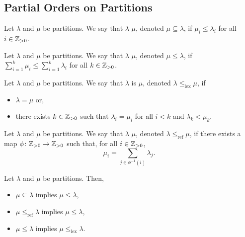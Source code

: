 \subsection{Partial Orders on Partitions}

\begin{definition}
    Let \(\lambda\) and \(\mu\) be partitions.
    We say that \(\lambda\)  \(\mu\), denoted \(\mu \subseteq \lambda\), if \(\mu_i \leq \lambda_i\) for all \(i \in \mathbb{Z}_{> 0}\). 
\end{definition}

\begin{definition}
    Let \(\lambda\) and \(\mu\) be partitions.
    We say that \(\lambda\)  \(\mu\), denoted \(\mu \leq \lambda\), if \(\sum_{i=1}^k \mu_i \leq \sum_{i=1}^k \lambda_i\) for all \(k \in \mathbb{Z}_{> 0}\).
\end{definition}

\newcommand\lexleq{\leq_{\mathrm{lex}}}

\begin{definition}
    Let \(\lambda\) and \(\mu\) be partitions.
    We say that \(\lambda\) is  \(\mu\), denoted \(\lambda \lexleq \mu\), if
    \begin{itemize}
        \item \(\lambda = \mu\) or,
        \item there exists \(k \in \mathbb{Z}_{> 0}\) such that \(\lambda_i = \mu_i\) for all \(i < k\) and \(\lambda_k < \mu_k\).
    \end{itemize}
\end{definition}

\newcommand\refines{\leq_{\mathrm{ref}}}
\newcommand\lessref{<_{\mathrm{ref}}}

\begin{definition}
    Let \(\lambda\) and \(\mu\) be partitions.
    We say that \(\lambda\)  \(\mu\),
    denoted \(\lambda \refines \mu\),
    if there exists a map \(\phi \colon \mathbb{Z}_{> 0} \to \mathbb{Z}_{> 0}\) such that, for all \(i \in \mathbb{Z}_{> 0}\),
    \begin{equation}
        \mu_i = \sum_{j \in \phi^{-1}(i)} \lambda_j.
    \end{equation}
\end{definition}

\begin{proposition}
    Let \(\lambda\) and \(\mu\) be partitions.
    Then,
    \begin{itemize}
        \item \(\mu \subseteq \lambda\) implies \(\mu \leq \lambda\),
        \item \(\mu \refines \lambda\) implies \(\mu \leq \lambda\),
        \item \(\mu \leq \lambda\) implies \(\mu \lexleq \lambda\).
    \end{itemize}
\end{proposition}

